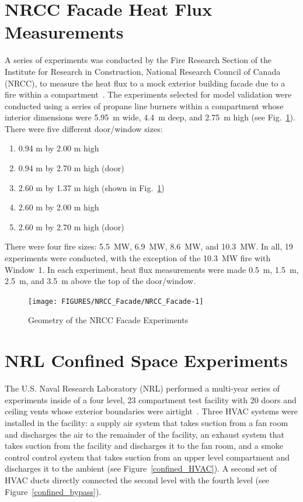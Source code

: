 \section{NRCC Facade Heat Flux Measurements}

A series of experiments was conducted by the Fire Research Section of the Institute for Research in Construction, National Research Council of Canada (NRCC),
to measure the heat flux to a mock exterior building facade due to a fire within a compartment~\cite{Oleszkiewicz:ASME,Oleszkiewicz:FireTech}. The experiments selected for model
validation were conducted using a series of propane line burners within a compartment whose interior dimensions were 5.95~m wide, 4.4~m deep, and 2.75~m high (see
Fig.~\ref{NRCC_Facade_Drawing}). There
were five different door/window sizes:
\begin{enumerate}
\item 0.94 m by 2.00 m high
\item 0.94 m by 2.70 m high (door)
\item 2.60 m by 1.37 m high (shown in Fig.~\ref{NRCC_Facade_Drawing})
\item 2.60 m by 2.00 m high
\item 2.60 m by 2.70 m high (door)
\end{enumerate}
There were four fire sizes: 5.5~MW, 6.9~MW, 8.6~MW, and 10.3~MW. In all, 19 experiments were conducted, with the exception of the 10.3~MW fire with Window~1. In each
experiment, heat flux measurements were made 0.5~m, 1.5~m, 2.5~m, and 3.5~m above the top of the door/window.

\begin{figure}
\begin{center}
\texttt{[image: FIGURES/NRCC\_Facade/NRCC\_Facade-1]}
\end{center}
\caption{Geometry of the NRCC Facade Experiments}
\label{NRCC_Facade_Drawing}
\end{figure}


\clearpage

\section{NRL Confined Space Experiments}

The U.S. Naval Research Laboratory (NRL) performed a multi-year series of experiments inside of a four level,
23 compartment test facility with 20 doors and ceiling vents whose exterior boundaries were airtight~\cite{Confined_JFPE}.
Three HVAC systems were installed in the facility: a supply air system that takes suction from a fan room and discharges the air to the remainder of the facility,
an exhaust system that takes suction from the facility and discharges it to the fan room, and a smoke control control system that takes suction from an upper
level compartment and discharges it to the ambient (see Figure~\ref{confined_HVAC}).
A second set of HVAC ducts directly connected the second level with the fourth level (see Figure~\ref{confined_bypass}).

